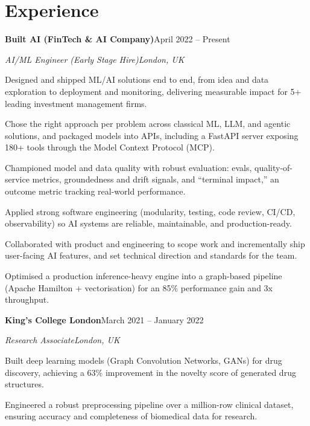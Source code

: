 \documentclass[10pt,a4paper]{article}
\newcommand{\entry}[4]{%
  {\color{company}\bfseries #1}\hfill {\color{muted}#2}\par
  \vspace{1pt}
  {\itshape #3}\hfill {\color{muted}\itshape #4}\par
  \vspace{3pt}%
}
\begin{document}
\section{Experience}
\entry{Built AI (FinTech \& AI Company)}{April 2022 -- Present}{AI/ML Engineer (Early Stage Hire)}{London, UK}
\begin{tight}
  \item Designed and shipped ML/AI solutions end to end, from idea and data exploration to deployment and monitoring, delivering measurable impact for 5+ leading investment management firms.
  \item Chose the right approach per problem across classical ML, LLM, and agentic solutions, and packaged models into APIs, including a FastAPI server exposing 180+ tools through the Model Context Protocol (MCP).
  \item Championed model and data quality with robust evaluation: evals, quality-of-service metrics, groundedness and drift signals, and ``terminal impact,'' an outcome metric tracking real-world performance.
  \item Applied strong software engineering (modularity, testing, code review, CI/CD, observability) so AI systems are reliable, maintainable, and production-ready.
  \item Collaborated with product and engineering to scope work and incrementally ship user-facing AI features, and set technical direction and standards for the team.
  \item Optimised a production inference-heavy engine into a graph-based pipeline (Apache Hamilton + vectorisation) for an 85\% performance gain and 3x throughput.
\end{tight}

\entry{King's College London}{March 2021 -- January 2022}{Research Associate}{London, UK}
\begin{tight}
  \item Built deep learning models (Graph Convolution Networks, GANs) for drug discovery, achieving a 63\% improvement in the novelty score of generated drug structures.
  \item Engineered a robust preprocessing pipeline over a million-row clinical dataset, ensuring accuracy and completeness of biomedical data for research.
\end{tight}

\end{document}
